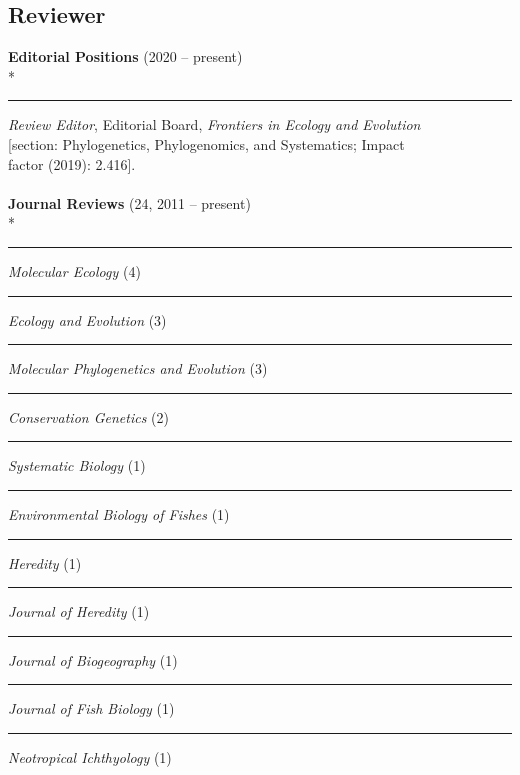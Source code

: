 \documentclass[margin,line]{res}
\begin{document}
\begin{resume}

\section{\sc Reviewer}
\textbf{Editorial Positions} (2020 -- present)\\*
\rule{-1mm}{5mm} \hspace*{4mm} \textit{Review Editor}, Editorial Board, \emph{Frontiers in Ecology and Evolution}\\
\hspace*{4mm} [section: Phylogenetics, Phylogenomics, and Systematics; Impact \\
\hspace*{4mm} factor (2019): 2.416].\\
\\
\textbf{Journal Reviews} (24, 2011 -- present)\\*
\rule{-1mm}{5mm} \hspace*{4mm} \textit{Molecular Ecology} (4) \\
\rule{-1mm}{5mm} \hspace*{4mm} \textit{Ecology and Evolution} (3) \\
\rule{-1mm}{5mm} \hspace*{4mm} \textit{Molecular Phylogenetics and Evolution} (3) \\
\rule{-1mm}{5mm} \hspace*{4mm} \textit{Conservation Genetics} (2) \\
\rule{-1mm}{5mm} \hspace*{4mm} \textit{Systematic Biology} (1) \\
\rule{-1mm}{5mm} \hspace*{4mm} \textit{Environmental Biology of Fishes} (1) \\
\rule{-1mm}{5mm} \hspace*{4mm} \textit{Heredity} (1) \\
\rule{-1mm}{5mm} \hspace*{4mm} \textit{Journal of Heredity} (1) \\
\rule{-1mm}{5mm} \hspace*{4mm} \textit{Journal of Biogeography} (1) \\
\rule{-1mm}{5mm} \hspace*{4mm} \textit{Journal of Fish Biology} (1) \\
\rule{-1mm}{5mm} \hspace*{4mm} \textit{Neotropical Ichthyology} (1) \\

\end{resume}
\end{document}
